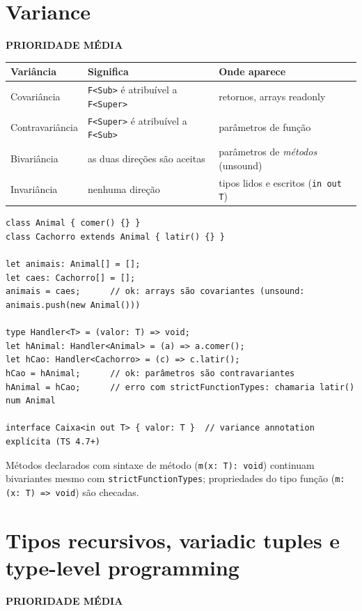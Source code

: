 \documentclass[12pt,a4paper,oneside]{book}
\newcommand{\media}{\colorbox{orange!20}{\sffamily\scriptsize\bfseries PRIORIDADE MÉDIA}}
\newcommand{\code}[1]{\texttt{#1}}
\begin{document}
\section{Variance}
\media

{\small
\begin{tabularx}{\textwidth}{@{}lXX@{}}
\toprule
\textbf{Variância} & \textbf{Significa} & \textbf{Onde aparece} \\
\midrule
Covariância & \code{F<Sub>} é atribuível a \code{F<Super>} & retornos, arrays readonly \\
Contravariância & \code{F<Super>} é atribuível a \code{F<Sub>} & parâmetros de função \\
Bivariância & as duas direções são aceitas & parâmetros de \emph{métodos} (unsound) \\
Invariância & nenhuma direção & tipos lidos e escritos (\code{in out T}) \\
\bottomrule
\end{tabularx}
}

\begin{verbatim}
class Animal { comer() {} }
class Cachorro extends Animal { latir() {} }

let animais: Animal[] = [];
let caes: Cachorro[] = [];
animais = caes;      // ok: arrays são covariantes (unsound: animais.push(new Animal()))

type Handler<T> = (valor: T) => void;
let hAnimal: Handler<Animal> = (a) => a.comer();
let hCao: Handler<Cachorro> = (c) => c.latir();
hCao = hAnimal;      // ok: parâmetros são contravariantes
hAnimal = hCao;      // erro com strictFunctionTypes: chamaria latir() num Animal

interface Caixa<in out T> { valor: T }  // variance annotation explícita (TS 4.7+)
\end{verbatim}

Métodos declarados com sintaxe de método (\code{m(x: T): void}) continuam bivariantes mesmo com \code{strictFunctionTypes}; propriedades do tipo função (\code{m: (x: T) => void}) são checadas.

\section{Tipos recursivos, variadic tuples e type-level programming}
\media
\end{document}
